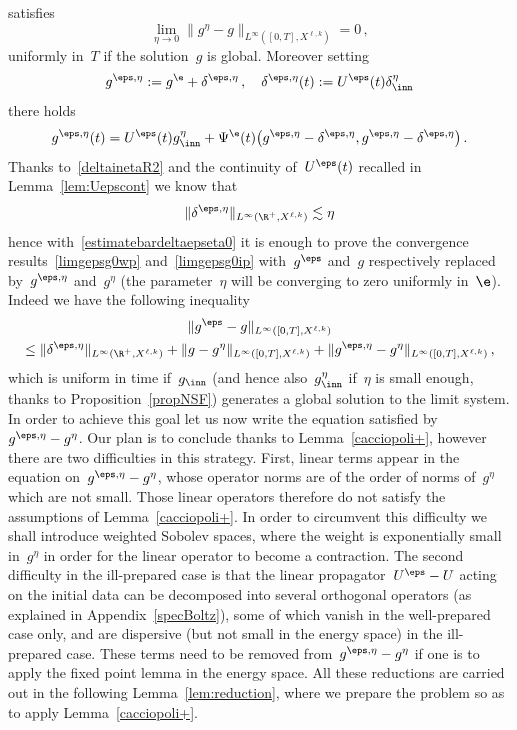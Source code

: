 satisfies
\begin{equation}\label{estimatebardeltaepseta0}
\lim_{\eta\to0}\big\|g^\eta - g\big\|_{L^\infty([0,T],X^{\ell,k})}=0 \,,
\end{equation}
uniformly in~$T $ if the solution~$g$ is global. Moreover setting
\begin{equation}\label{defgepseta}
g^{\eps,\eta} :=g^\e + \delta^{\eps,\eta} \,, \quad \delta^{\eps,\eta} (t) := U^\eps(t) \delta^\eta_{\inn}
\end{equation}
there holds
\begin{equation}\label{eqgepseta}
g^{\eps,\eta}(t) =U^\eps(t) g^\eta _{\inn} + \Psi^\e(t) \big(g^{\eps,\eta}- \delta^{\eps,\eta},g^{\eps,\eta}- \delta^{\eps,\eta} \big) \,.
\end{equation}
Thanks to~\eqref{deltainetaR2} and the continuity of~$U^\eps(t) $ recalled in Lemma~\ref{lem:Uepscont} we know that
\begin{equation}\label{estimatedeltaepseta0}
\| \delta^{\eps,\eta} \|_{L^\infty(\R^+,{X}^{\ell,k})}\lesssim \eta
\end{equation}
hence with~\eqref{estimatebardeltaepseta0} it is enough to prove the convergence results~\eqref{limgepsg0wp} and~\eqref{limgepsg0ip} with~$ g^\eps $ and~$g$ respectively replaced by~$ g^{\eps,\eta} $ and~$ g^{\eta} $ (the parameter~$\eta$ will be converging to zero uniformly in~$\e$). Indeed we have the following inequality
\begin{multline*}
\|g^\eps-g\|_{L^\infty ([0,T],{X}^{\ell,k})}\\ \le \|\delta^{\eps,\eta}\|_{L^\infty (\R^+,{X}^{\ell,k})} + \|g-g^\eta\|_{L^\infty ([0,T],{X}^{\ell,k})} + \|g^{\eps,\eta}-g^\eta\|_{L^\infty ([0,T],{X}^{\ell,k})} \,,
\end{multline*}
which is uniform in time if~$ g _{\inn} $ (and hence also~$ g^\eta _{\inn} $ if~$\eta$ is small enough, thanks to Proposition~\ref{propNSF}) generates a global solution to the limit system. In order to achieve this goal let us now write the equation satisfied by~$ g^{\eps,\eta}-g^{\eta} $. Our plan is to conclude thanks to Lemma~\ref{cacciopoli+}, however there are two difficulties in this strategy. First, linear terms appear in the equation on~$ g^{\eps,\eta}-g^{\eta} $, whose operator norms are of the order of norms of~$g^\eta$ which are not small. Those linear operators therefore do not satisfy the assumptions of Lemma~\ref{cacciopoli+}. In order to circumvent this difficulty we shall introduce weighted Sobolev spaces, where the weight is exponentially small in~$g^\eta$ in order for the linear operator to become a contraction. The second difficulty in the ill-prepared case is that the linear propagator~$U^\eps-U$ acting on the initial data can be decomposed into several orthogonal operators (as explained in Appendix~\ref{specBoltz}), some of which vanish in the well-prepared case only, and are dispersive (but not small in the energy space) in the ill-prepared case. These terms need to be removed from~$ g^{\eps,\eta}-g^{\eta}$ if one is to apply the fixed point lemma in the energy space. All these reductions are carried out in the following Lemma~\ref{lem:reduction}, where we prepare the problem so as to apply Lemma~\ref{cacciopoli+}.

